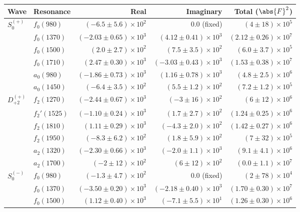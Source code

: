 \begin{table}[ht]
    \begin{center}
        \begin{tabular}{llrrr}\toprule
        Wave & Resonance & Real & Imaginary & Total ($\abs{F}^2$) \\\midrule
$S_{0}^{(+)}$ & $f_{0}(980)$ & $(-6.5 \pm 5.6) \times 10^{2}$ & $0.0$ (fixed) & $(4 \pm 18) \times 10^{5}$ \\
 & $f_{0}(1370)$ & $(-2.03 \pm 0.65) \times 10^{3}$ & $(4.12 \pm 0.41) \times 10^{3}$ & $(2.12 \pm 0.26) \times 10^{7}$ \\
 & $f_{0}(1500)$ & $(2.0 \pm 2.7) \times 10^{2}$ & $(7.5 \pm 3.5) \times 10^{2}$ & $(6.0 \pm 3.7) \times 10^{5}$ \\
 & $f_{0}(1710)$ & $(2.47 \pm 0.30) \times 10^{3}$ & $(-3.03 \pm 0.43) \times 10^{3}$ & $(1.53 \pm 0.38) \times 10^{7}$ \\
 & $a_{0}(980)$ & $(-1.86 \pm 0.73) \times 10^{3}$ & $(1.16 \pm 0.78) \times 10^{3}$ & $(4.8 \pm 2.5) \times 10^{6}$ \\
 & $a_{0}(1450)$ & $(-6.4 \pm 3.5) \times 10^{2}$ & $(5.5 \pm 1.2) \times 10^{2}$ & $(7.2 \pm 1.2) \times 10^{5}$ \\
$D_{+2}^{(+)}$ & $f_{2}(1270)$ & $(-2.44 \pm 0.67) \times 10^{3}$ & $(-3 \pm 16) \times 10^{2}$ & $(6 \pm 12) \times 10^{6}$ \\
 & $f_{2}'(1525)$ & $(-1.10 \pm 0.24) \times 10^{3}$ & $(1.7 \pm 2.7) \times 10^{2}$ & $(1.24 \pm 0.25) \times 10^{6}$ \\
 & $f_{2}(1810)$ & $(1.11 \pm 0.29) \times 10^{3}$ & $(-4.3 \pm 2.0) \times 10^{2}$ & $(1.42 \pm 0.27) \times 10^{6}$ \\
 & $f_{2}(1950)$ & $(-8.3 \pm 6.2) \times 10^{2}$ & $(1.8 \pm 5.9) \times 10^{2}$ & $(7 \pm 32) \times 10^{5}$ \\
 & $a_{2}(1320)$ & $(-2.30 \pm 0.66) \times 10^{3}$ & $(-2.0 \pm 1.1) \times 10^{3}$ & $(9.1 \pm 4.1) \times 10^{6}$ \\
 & $a_{2}(1700)$ & $(-2 \pm 12) \times 10^{2}$ & $(6 \pm 12) \times 10^{2}$ & $(0.0 \pm 1.1) \times 10^{7}$ \\
$S_{0}^{(-)}$ & $f_{0}(980)$ & $(-1.3 \pm 4.7) \times 10^{2}$ & $0.0$ (fixed) & $(2 \pm 78) \times 10^{4}$ \\
 & $f_{0}(1370)$ & $(-3.50 \pm 0.20) \times 10^{3}$ & $(-2.18 \pm 0.40) \times 10^{3}$ & $(1.70 \pm 0.30) \times 10^{7}$ \\
 & $f_{0}(1500)$ & $(1.12 \pm 0.40) \times 10^{3}$ & $(-7.1 \pm 5.5) \times 10^{1}$ & $(1.26 \pm 0.30) \times 10^{6}$ \\

\end{tabular}
\end{center}
\end{table}
